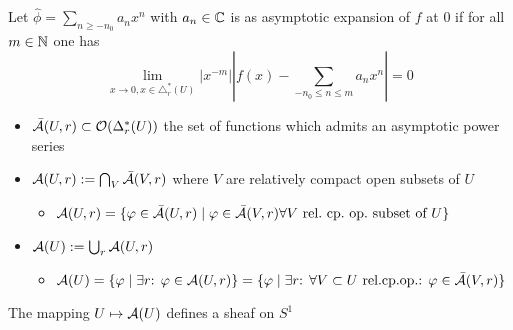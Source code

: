 Let $\hat\phi=\sum_{n\geq-n_0}a_nx^n$ with $a_n\in\mathbb{C}$ is as asymptotic
expansion of $f$ at $0$ if for all $m\in\mathbb{N}$ one has
\begin{equation} \label{eq:asymptoticExpansion}
  \lim_{x\to 0,x\in\triangle_r^*(U)}
  \left|x^{-m}\right|\left|f(x)-\sum_{-n_0\leq n\leq m}a_{n}x^{n}\right|
  =0
\end{equation}
\begin{defn}
  \begin{itemize}
    \item $\bar{\mathcal{A}}(U,r)\subset\mathcal{O}(\Delta_r^*(U))$ the set of functions which
      admits an asymptotic power series
    \item $\mathcal{A}(U,r):=\bigcap_{V}\bar{\mathcal{A}}(V,r)$ where $V$ are relatively
      compact open subsets of $U$
      \begin{itemize}
        \item $\mathcal{A}(U,r)=\{\varphi\in \bar{\mathcal{A}}(U,r)
          \mid \varphi\in \bar{\mathcal{A}}(V,r)
          \forall V\text{ rel.\  cp.\  op.\  subset of }U\}$
      \end{itemize}
    \item $\mathcal{A}(U):=\bigcup_r\mathcal{A}(U,r)$%
      \begin{itemize}
        \item $\mathcal{A}(U)=\{\varphi\mid\exists r\text{: } \varphi\in\mathcal{A}(U,r)\}
          =\{\varphi\mid\exists r\text{: }
            \forall V\subset U\text{ rel.cp.op.}\text{: }
            \varphi\in\bar{\mathcal{A}}(V,r)\}$
      \end{itemize}
  \end{itemize}
\end{defn}
The mapping $U\mapsto\mathcal{A}(U)$ defines a sheaf on $S^1$

